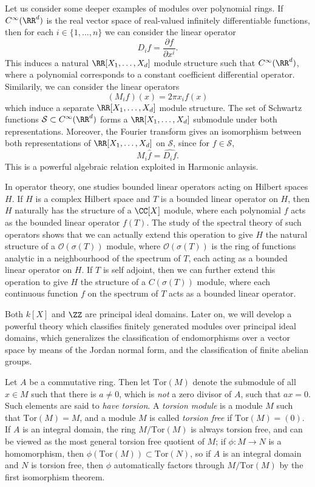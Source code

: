 \begin{example}
    Let us consider some deeper examples of modules over polynomial rings. If $C^\infty(\RR^d)$ is the real vector space of real-valued infinitely differentiable functions, then for each $i \in \{ 1, \dots, n \}$ we can consider the linear operator
    \[ D_i f = \frac{\partial f}{\partial x^i}. \]
    This induces a natural $\RR[X_1,\dots,X_d]$ module structure such that $C^\infty(\RR^d)$, where a polynomial corresponds to a constant coefficient differential operator. Similarily, we can consider the linear operators
    \[ (M_i f)(x) = 2 \pi x_i f(x) \]
    which induce a separate $\RR[X_1,\dots,X_d]$ module structure. The set of Schwartz functions $\mathcal{S} \subset C^\infty(\RR^d)$ forms a $\RR[X_1,\dots,X_d]$ submodule under both representations. Moreover, the Fourier transform gives an isomorphism between both representations of $\RR[X_1,\dots,X_d]$ on $\mathcal{S}$, since for $f \in \mathcal{S}$,
    \[ M_i \widehat{f} = \widehat{D_i f}. \]
    This is a powerful algebraic relation exploited in Harmonic anlaysis.

    In operator theory, one studies bounded linear operators acting on Hilbert spaces $H$. If $H$ is a complex Hilbert space and $T$ is a bounded linear operator on $H$, then $H$ naturally has the structure of a $\CC[X]$ module, where each polynomial $f$ acts as the bounded linear operator $f(T)$. The study of the spectral theory of such operators shows that we can actually extend this operation to give $H$ the natural structure of a $\mathcal{O}(\sigma(T))$ module, where $\mathcal{O}(\sigma(T))$ is the ring of functions analytic in a neighbourhood of the spectrum of $T$, each acting as a bounded linear operator on $H$. If $T$ is self adjoint, then we can further extend this operation to give $H$ the structure of a $C(\sigma(T))$ module, where each continuous function $f$ on the spectrum of $T$ acts as a bounded linear operator.
\end{example}

Both $k[X]$ and $\ZZ$ are principal ideal domains. Later on, we will develop a powerful theory which classifies finitely generated modules over principal ideal domains, which generalizes the classification of endomorphisms over a vector space by means of the Jordan normal form, and the classification of finite abelian groups.

\begin{example}
    Let $A$ be a commutative ring. Then let $\text{Tor}(M)$ denote the submodule of all $x \in M$ such that there is $a \neq 0$, which is \emph{not} a zero divisor of $A$, such that $ax = 0$. Such elements are said to \emph{have torsion}. A \emph{torsion module} is a module $M$ such that $\text{Tor}(M) = M$, and a module $M$ is called \emph{torsion free} if $\text{Tor}(M) = (0)$. If $A$ is an integral domain, the ring $M / \text{Tor}(M)$ is always torsion free, and can be viewed as the most general torsion free quotient of $M$; if $\phi: M \to N$ is a homomorphism, then $\phi(\text{Tor}(M)) \subset \text{Tor}(N)$, so if $A$ is an integral domain and $N$ is torsion free, then $\phi$ automatically factors through $M/\text{Tor}(M)$ by the first isomorphism theorem.
\end{example}

